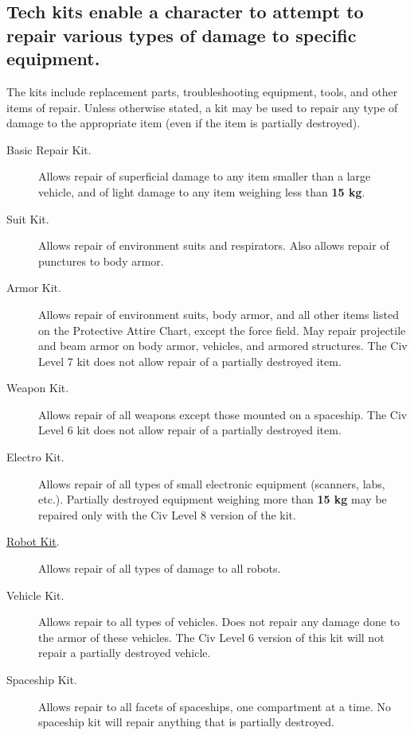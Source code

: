 \subsection[Tech Kits]{Tech kits enable a character to attempt to
  repair various types of damage to specific equipment.}
\label{sec:tech-kits}

The kits include replacement parts, troubleshooting equipment, tools,
and other items of repair. Unless otherwise stated, a kit may be used
to repair any type of damage to the appropriate item (even if the item
is partially destroyed).

\begin{description}
\item[\hypertarget{tag:basicrepait}{Basic Repair Kit}.] Allows repair of superficial damage to any
  item smaller than a large vehicle, and of light damage to any item
  weighing less than \textbf{15 kg}.
\item[Suit Kit.] Allows repair of environment suits and respirators.
  Also allows repair of punctures to body armor.
\item[Armor Kit.] Allows repair of environment suits, body armor, and
  all other items listed on the Protective Attire Chart, except the
  force field. May repair projectile and beam armor on body armor,
  vehicles, and armored structures. The Civ Level 7 kit does not allow
  repair of a partially destroyed item.
\item[Weapon Kit.] Allows repair of all weapons except those mounted
  on a spaceship. The Civ Level 6 kit does not allow repair of a
  partially destroyed item.
\item[\hypertarget{tag:electrokit}{Electro Kit}.] Allows repair of all types of small electronic
  equipment (scanners, labs, etc.). Partially destroyed equipment
  weighing more than \textbf{15 kg} may be repaired only with the Civ
  Level 8 version of the kit.
\item[\hyperlink{tag:robotkit}{Robot Kit}.] Allows repair of all types of damage to all robots. 
\item[\hypertarget{tag:vehiclekit}{Vehicle Kit}.] Allows repair to all types of vehicles. Does not
  repair any damage done to the armor of these vehicles. The Civ Level
  6 version of this kit will not repair a partially destroyed vehicle.
\item[\hypertarget{tag:spaceshipkit}{Spaceship Kit}.] Allows repair to all facets of spaceships, one
  compartment at a time. No spaceship kit will repair anything that is
  partially destroyed.
\end{description}

